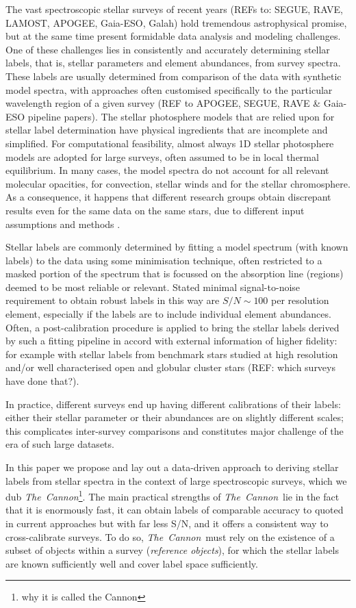 \documentclass[12pt, preprint]{aastex}
\newcommand{\tc}{\textsl{The~Cannon}}
\begin{document}
The vast spectroscopic stellar surveys of recent years (REFs to: SEGUE, RAVE, LAMOST, APOGEE, Gaia-ESO, Galah) hold tremendous astrophysical promise, but at the same time present formidable data analysis and modeling challenges. 
One of these challenges lies in consistently and accurately determining stellar labels, that is, stellar parameters and element abundances, from survey spectra. 
These labels are usually determined from comparison of the data with synthetic model spectra, with approaches often 
customised specifically to the particular wavelength region of a given survey (REF to APOGEE, SEGUE, RAVE \& Gaia-ESO pipeline papers). 
The stellar photosphere models that are relied upon for stellar label determination have physical ingredients that are incomplete and simplified. 
For computational feasibility, almost always 1D stellar photosphere models are adopted for large surveys, often assumed to be in local thermal equilibrium. 
In many cases, the model spectra do not account for all relevant  molecular opacities, for convection, stellar winds and for the stellar chromosphere. 
As a consequence, it happens that different research groups obtain discrepant results even for the same data on the same stars, due to different input assumptions and methods \citep[e.g.]{Sm2014}. 

Stellar labels are commonly determined by fitting a model spectrum (with known labels) to the data using some minimisation technique, often restricted to a masked portion of the spectrum that is focussed on the absorption line (regions) deemed to be most reliable or relevant. 
Stated minimal signal-to-noise requirement to obtain robust labels in this way are $S/N\sim 100$ per resolution element, especially if the labels are to include individual element abundances. 
Often, a post-calibration procedure is applied to bring the stellar labels derived by such a fitting pipeline in accord with external information of higher fidelity: for example with stellar labels from benchmark stars studied at high resolution and/or well characterised open and globular cluster stars (REF: which surveys have done that?). 

In practice, different surveys end up having different calibrations of their labels: either their stellar parameter or their abundances are on slightly different scales; this complicates
inter-survey comparisons and constitutes major challenge of the era of such large datasets. 

In this paper we propose and lay out a data-driven approach to deriving stellar labels from stellar spectra in the context of large spectroscopic surveys, which we dub \tc\footnote{why it is called the Cannon}. 
The main practical strengths of \tc\ lie in the fact that it is enormously fast, it can obtain labels of comparable accuracy to quoted in current approaches but with far less S/N, and it offers a consistent way to cross-calibrate surveys. 
To do so, \tc\ must rely on the existence of a subset of objects within a survey
(\textit{reference objects}), for which the stellar labels are known sufficiently well and cover label space sufficiently.
\end{document}
